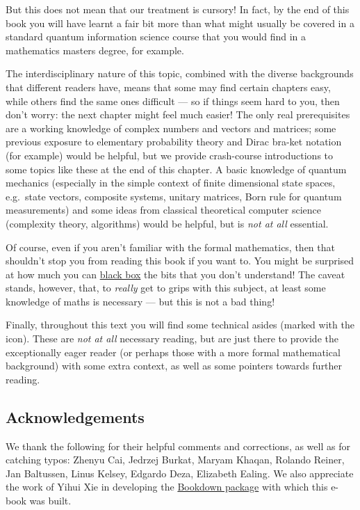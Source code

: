 \documentclass[fleqn]{article}
\begin{document}
But this does not mean that our treatment is cursory!
In fact, by the end of this book you will have learnt a fair bit more than what might usually be covered in a standard quantum information science course that you would find in a mathematics masters degree, for example.

The interdisciplinary nature of this topic, combined with the diverse backgrounds that different readers have, means that some may find certain chapters easy, while others find the same ones difficult --- so if things seem hard to you, then don't worry: the next chapter might feel much easier!
The only real prerequisites are a working knowledge of complex numbers and vectors and matrices; some previous exposure to elementary probability theory and Dirac bra-ket notation (for example) would be helpful, but we provide crash-course introductions to some topics like these at the end of this chapter.
A basic knowledge of quantum mechanics (especially in the simple context of finite dimensional state spaces, e.g.~state vectors, composite systems, unitary matrices, Born rule for quantum measurements) and some ideas from classical theoretical computer science (complexity theory, algorithms) would be helpful, but is \emph{not at all} essential.

Of course, even if you aren't familiar with the formal mathematics, then that shouldn't stop you from reading this book if you want to.
You might be surprised at how much you can \href{https://en.wikipedia.org/wiki/Black_box}{black box} the bits that you don't understand!
The caveat stands, however, that, to \emph{really} get to grips with this subject, at least some knowledge of maths is necessary --- but this is not a bad thing!

Finally, throughout this text you will find some technical asides (marked with the icon).
These are \emph{not at all} necessary reading, but are just there to provide the exceptionally eager reader (or perhaps those with a more formal mathematical background) with some extra context, as well as some pointers towards further reading.

\hypertarget{acknowledgements}{%
\subsection*{Acknowledgements}\label{acknowledgements}}

We thank the following for their helpful comments and corrections, as well as for catching typos: Zhenyu Cai, Jedrzej Burkat, Maryam Khaqan, Rolando Reiner, Jan Baltussen, Linus Kelsey, Edgardo Deza, Elizabeth Ealing.
We also appreciate the work of Yihui Xie in developing the \href{https://bookdown.org/yihui/bookdown/}{Bookdown package} with which this e-book was built.
\end{document}

